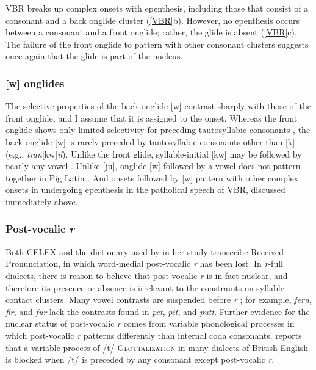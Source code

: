 \noindent
VBR breaks up complex onsets with epenthesis, including those that consist of a consonant and a back onglide cluster (\ref{VBR}b). However, no epenthesis occurs between a consonant and a front onglide; rather, the glide is absent (\ref{VBR}c). The failure of the front onglide to pattern with other consonant clusters suggests once again that the glide is part of the nucleus. 


\subsubsection{[w] onglides}

The selective properties of the back onglide [w] contrast sharply with those of the front onglide, and I assume that it is assigned to the onset. Whereas the front onglide shows only limited selectivity for preceding tautosyllabic consonants \citep{Davis1995,Kaye1996}, the back onglide [w] is rarely preceded by tautosyllabic consonants other than [k] (e.g., \emph{tran}[kw]\emph{il}). Unlike the front glide, syllable-initial [kw] may be followed by nearly any vowel \citep[][161]{Davis1995}. Unlike [ju\lm], onglide [w] followed by a vowel does not pattern together in Pig Latin \citep[][166]{Davis1995}. And onsets followed by [w] pattern with other complex onsets in undergoing epenthesis in the patholical speech of VBR, discussed immediately above.


\subsubsection{Post-vocalic \emph{r}}

Both CELEX and the dictionary used by \citet{Pierrehumbert1994} in her study transcribe Received Pronunciation, in which word-medial post-vocalic \emph{r} has been lost. In \emph{r}-full dialects, there is reason to believe that post-vocalic \emph{r} is in fact nuclear, and therefore its presence or absence is irrelevant to the constraints on syllable contact clusters. Many vowel contrasts are suspended before \emph{r} \citep[][255]{Harris1994}; for example, \emph{fern}, \emph{fir}, and \emph{fur} lack the contrasts found in \emph{pet}, \emph{pit}, and \emph{putt}. Further evidence for the nuclear status of post-vocalic \emph{r} comes from variable phonological processes in which post-vocalic \emph{r} patterns differently than internal coda consonants. \citeauthor{Harris1994} reports that a variable process of /t/-\textsc{Glottalization} in many dialects of British English is blocked when /t/ is preceded by any consonant except post-vocalic \emph{r}.

